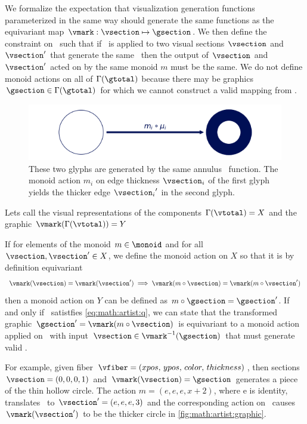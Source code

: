 \documentclass[../main.tex]{subfiles}
\begin{document}
We formalize the expectation that visualization generation functions parameterized in the same way should generate the same functions as the equivariant map $\vmark: \vsection \mapsto \gsection$. We then define the constraint on \vmark\ such that if \vmark\ is applied to two visual sections $\vsection$ and $\vsection^{\prime}$ that generate the same \gsection\, then the output of $\vsection$ and $\vsection^{\prime}$ acted on by the same monoid $m$ must be the same.  We do not define monoid actions on all of $\Gamma(\gtotal)$ because there may be graphics $\gsection \in \Gamma(\gtotal)$ for which we cannot construct a valid mapping from \vtotal.
\begin{figure}[htb]
  \centering
  \includegraphics[width=\textwidth]{figures/math/diff_type_q.png}
  \caption{These two glyphs are generated by the same annulus \vmark\ function. The monoid action $m_i$ on edge thickness $\vsection_i$ of the first glyph yields the thicker edge ${\vsection_i}^{\prime}$ in the second glyph.}
  \label{fig:math:artist:graphic}
\end{figure}
Lets call the visual representations of the components $\Gamma(\vtotal)=X$ and the graphic $\vmark(\Gamma(\vtotal))=Y$
\begin{prop}
If for elements of the monoid $m \in \monoid$ and for all $\vsection, \vsection^{\prime} \in X$, we define the monoid action on $X$ so that it is by definition equivariant
\begin{equation}
\vmark(\vsection) = \vmark(\vsection^{\prime})\implies \vmark(m\circ\vsection) = \vmark(m\circ\vsection^{\prime})
\label{eq:math:artist:q}
\end{equation}
then a monoid action on $Y$ can be defined as $m\circ \gsection = \gsection^{\prime}$. If and only if \vmark\ satistfies \autoref{eq:math:artist:q}, we can state that the transformed graphic $\gsection^{\prime}=\vmark(m\circ \vsection)$ is equivariant to a monoid action applied on \vmark\ with input $\vsection \in \vmark^{-1}(\gsection)$ that must generate valid \gsection. 
\end{prop}

For example, given fiber $\vfiber=(xpos,\, ypos,\, color,\, thickness)$, then sections $\vsection=(0,0,0,1)$ and $\vmark(\vsection) = \gsection$ generates a piece of the thin hollow circle. The action $m=(e, e, e, x+2)$, where e is identity, translates \vsection\ to  $\vsection^{\prime}=(e,e,e,3)$ and the corresponding action on \gsection\ causes $\vmark(\vsection^{\prime})$ to be the thicker circle in \autoref{fig:math:artist:graphic}.
\end{document}
